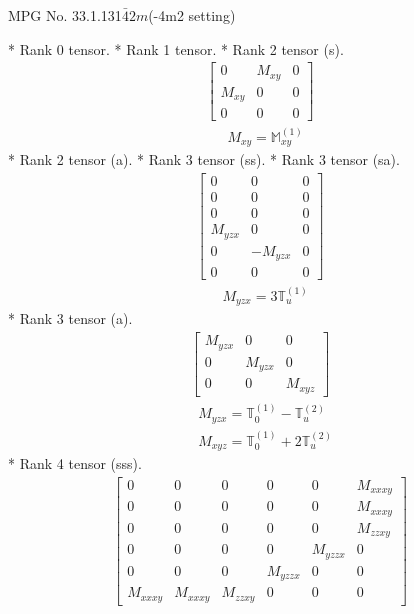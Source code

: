 \documentclass[fleqn,8pt,landscape]{jsarticle}
\begin{document}
\setcounter{MaxMatrixCols}{32}

\renewcommand{\tablename}{Table~}
\renewcommand{\figurename}{Figure~}
\begin{center}
\LARGE
MPG No. 33.1.131\quad$\bar{4}2m$\quad(-4m2 setting)
\end{center}
* Rank 0 tensor.
* Rank 1 tensor.
* Rank 2 tensor (s).
\begin{align*}
\begin{bmatrix} 0 & M_{xy} & 0 \\ M_{xy} & 0 & 0 \\ 0 & 0 & 0 \end{bmatrix}
\end{align*}
\begin{align*}
& M_{xy} = \mathbb{M}_{xy}^{(1)}
\end{align*}
* Rank 2 tensor (a).
* Rank 3 tensor (ss).
* Rank 3 tensor (sa).
\begin{align*}
\begin{bmatrix} 0 & 0 & 0 \\ 0 & 0 & 0 \\ 0 & 0 & 0 \\ M_{yzx} & 0 & 0 \\ 0 & - M_{yzx} & 0 \\ 0 & 0 & 0 \end{bmatrix}
\end{align*}
\begin{align*}
& M_{yzx} = 3 \mathbb{T}_{u}^{(1)}
\end{align*}
* Rank 3 tensor (a).
\begin{align*}
\begin{bmatrix} M_{yzx} & 0 & 0 \\ 0 & M_{yzx} & 0 \\ 0 & 0 & M_{xyz} \end{bmatrix}
\end{align*}
\begin{align*}
& M_{yzx} = \mathbb{T}_{0}^{(1)} - \mathbb{T}_{u}^{(2)} \\
& M_{xyz} = \mathbb{T}_{0}^{(1)} + 2 \mathbb{T}_{u}^{(2)}
\end{align*}
* Rank 4 tensor (sss).
\begin{align*}
\begin{bmatrix} 0 & 0 & 0 & 0 & 0 & M_{xxxy} \\ 0 & 0 & 0 & 0 & 0 & M_{xxxy} \\ 0 & 0 & 0 & 0 & 0 & M_{zzxy} \\ 0 & 0 & 0 & 0 & M_{yzzx} & 0 \\ 0 & 0 & 0 & M_{yzzx} & 0 & 0 \\ M_{xxxy} & M_{xxxy} & M_{zzxy} & 0 & 0 & 0 \end{bmatrix}
\end{align*}
\end{document}
